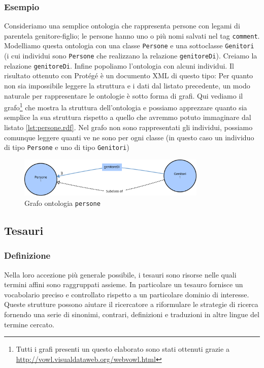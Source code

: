 \subsubsection{Esempio}
Consideriamo una semplice ontologia che rappresenta persone con legami di parentela genitore-figlio; le persone hanno uno o più nomi salvati nel tag \verb|comment|. Modelliamo questa ontologia con una classe \verb|Persone| e una sottoclasse \verb|Genitori| (i cui individui sono \verb|Persone| che realizzano la relazione \verb|genitoreDi|). Creiamo la relazione \verb|genitoreDi|. Infine popoliamo l'ontologia con alcuni individui. Il risultato ottenuto con Protégé è un documento XML di questo tipo:
Per quanto non sia impossibile leggere la struttura e i dati dal listato precedente, un modo naturale per rappresentare le ontologie è sotto forma di grafi. Qui vediamo il grafo\footnote{Tutti i grafi presenti un questo elaborato sono stati ottenuti grazie a \url{http://vowl.visualdataweb.org/webvowl.html}} che mostra la struttura dell'ontologia e possiamo apprezzare quanto sia semplice la sua struttura rispetto a quello che avremmo potuto immaginare dal listato \ref{lst:persone.rdf}. Nel grafo non sono rappresentati gli individui, possiamo comunque leggere quanti ve ne sono per ogni classe (in questo caso un individuo di tipo \verb|Persone| e uno di tipo \verb|Genitori|)
\begin{figure}[H]
	\centering
	\includegraphics[width=0.8\textwidth]{Picture/persone.rdf.pdf}
	\caption{Grafo ontologia \texttt{persone}}
\end{figure}


\subsection{Tesauri}
\subsubsection{Definizione}
Nella loro accezione più generale possibile, i tesauri sono risorse nelle quali termini affini sono raggruppati assieme\cite{kilgarriff2000s}. In particolare un tesauro fornisce un vocabolario preciso e controllato rispetto a un particolare dominio di interesse.\cite{srinivasan1992thesaurus} Queste strutture possono aiutare il ricercatore a riformulare le strategie di ricerca fornendo una serie di sinonimi, contrari, definizioni e traduzioni in altre lingue del termine cercato.

